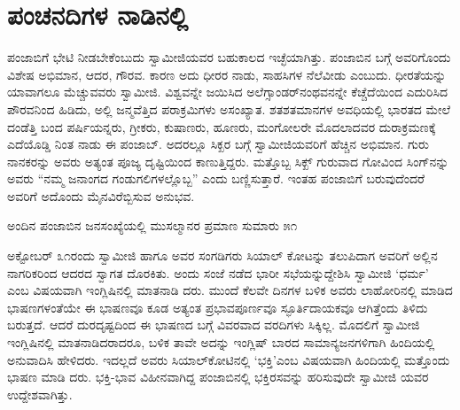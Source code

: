 
\chapter{ಪಂಚನದಿಗಳ ನಾಡಿನಲ್ಲಿ}

ಪಂಜಾಬಿಗೆ ಭೇಟಿ ನೀಡಬೇಕೆಂಬುದು ಸ್ವಾಮೀಜಿಯವರ ಬಹುಕಾಲದ ಇಚ್ಛೆಯಾಗಿತ್ತು. ಪಂಜಾಬಿನ ಬಗ್ಗೆ ಅವರಿಗೊಂದು ವಿಶೇಷ ಅಭಿಮಾನ, ಆದರ, ಗೌರವ. ಕಾರಣ ಅದು ಧೀರರ ನಾಡು, ಸಾಹಸಿಗಳ ನೆಲೆವೀಡು ಎಂಬುದು. ಧೀರತೆಯನ್ನು ಯಾವಾಗಲೂ ಮೆಚ್ಚುವವರು ಸ್ವಾಮೀಜಿ. ವಿಶ್ವವನ್ನೇ ಜಯಿಸಿದ ಅಲೆಗ್ಸಾಂಡರ್​ನಂಥವನನ್ನೇ ಕೆಚ್ಚೆದೆಯಿಂದ ಎದುರಿಸಿದ ಪೌರವನಿಂದ ಹಿಡಿದು, ಅಲ್ಲಿ ಜನ್ಮವೆತ್ತಿದ ಪರಾಕ್ರಮಿಗಳು ಅಸಂಖ್ಯಾತ. ಶತಶತಮಾನಗಳ ಅವಧಿಯಲ್ಲಿ ಭಾರತದ ಮೇಲೆ ದಂಡೆತ್ತಿ ಬಂದ ಪರ್ಷಿಯನ್ನರು, ಗ್ರೀಕರು, ಕುಷಾಣರು, ಹೂಣರು, ಮಂಗೋಲರೇ ಮೊದಲಾದವರ ದುರಾಕ್ರಮಣಕ್ಕೆ ಎದೆಯೊಡ್ಡಿ ನಿಂತ ನಾಡು ಈ ಪಂಜಾಬ್. ಅದರಲ್ಲೂ ಸಿಕ್ಖರ ಬಗ್ಗೆ ಸ್ವಾಮೀಜಿಯವರಿಗೆ ಹೆಚ್ಚಿನ ಅಭಿಮಾನ. ಗುರು ನಾನಕರನ್ನು ಅವರು ಅತ್ಯಂತ ಪೂಜ್ಯ ದೃಷ್ಟಿಯಿಂದ ಕಾಣುತ್ತಿದ್ದರು. ಮತ್ತೊಬ್ಬ ಸಿಕ್ಖ್ ಗುರುವಾದ ಗೋವಿಂದ ಸಿಂಗ್​ನನ್ನು ಅವರು “ನಮ್ಮ ಜನಾಂಗದ ಗಂಡುಗಲಿಗಳಲ್ಲೊಬ್ಬ” ಎಂದು ಬಣ್ಣಿಸುತ್ತಾರೆ. ಇಂತಹ ಪಂಜಾಬಿಗೆ ಬರುವುದೆಂದರೆ ಅವರಿಗೆ ಅದೊಂದು ಮೈನವಿರೆಬ್ಬಿಸುವ ಅನುಭವ.

ಅಂದಿನ ಪಂಜಾಬಿನ ಜನಸಂಖ್ಯೆಯಲ್ಲಿ ಮುಸಲ್ಮಾನರ ಪ್ರಮಾಣ ಸುಮಾರು ೫೧%

ಅಕ್ಟೋಬರ್ ೩೧ರಂದು ಸ್ವಾಮೀಜಿ ಹಾಗೂ ಅವರ ಸಂಗಡಿಗರು ಸಿಯಾಲ್ ಕೋಟನ್ನು ತಲುಪಿದಾಗ ಅವರಿಗೆ ಅಲ್ಲಿನ ನಾಗರಿಕರಿಂದ ಆದರದ ಸ್ವಾಗತ ದೊರಕಿತು. ಅಂದು ಸಂಜೆ ನಡೆದ ಭಾರೀ ಸಭೆಯನ್ನುದ್ದೇಶಿಸಿ ಸ್ವಾಮೀಜಿ ‘ಧರ್ಮ’ ಎಂಬ ವಿಷಯವಾಗಿ ಇಂಗ್ಲಿಷಿನಲ್ಲಿ ಮಾತನಾಡಿ ದರು. ಮುಂದೆ ಕೆಲವೇ ದಿನಗಳ ಬಳಿಕ ಅವರು ಲಾಹೋರಿನಲ್ಲಿ ಮಾಡಿದ ಭಾಷಣಗಳಂತೆಯೇ ಈ ಭಾಷಣವೂ ಕೂಡ ಅತ್ಯಂತ ಪ್ರಭಾವಪೂರ್ಣವೂ ಸ್ಫೂರ್ತಿದಾಯಕವೂ ಆಗಿತ್ತೆಂದು ತಿಳಿದು ಬರುತ್ತದೆ. ಆದರೆ ದುರದೃಷ್ಟದಿಂದ ಈ ಭಾಷಣದ ಬಗ್ಗೆ ವಿವರವಾದ ವರದಿಗಳು ಸಿಕ್ಕಿಲ್ಲ. ಮೊದಲಿಗೆ ಸ್ವಾಮೀಜಿ ಇಂಗ್ಲಿಷಿನಲ್ಲಿ ಮಾತನಾಡಿದರಾದರೂ, ಬಳಿಕ ತಾವೇ ಅದನ್ನು ಇಂಗ್ಲಿಷ್ ಬಾರದ ಸಾಮಾನ್ಯಜನಗಳಿಗಾಗಿ ಹಿಂದಿಯಲ್ಲಿ ಅನುವಾದಿಸಿ ಹೇಳಿದರು. ಇದಲ್ಲದೆ ಅವರು ಸಿಯಾಲ್​ಕೋಟಿನಲ್ಲಿ ‘ಭಕ್ತಿ’ಎಂಬ ವಿಷಯವಾಗಿ ಹಿಂದಿಯಲ್ಲಿ ಮತ್ತೊಂದು ಭಾಷಣ ಮಾಡಿ ದರು. ಭಕ್ತಿ-ಭಾವ ವಿಹೀನವಾಗಿದ್ದ ಪಂಜಾಬಿನಲ್ಲಿ ಭಕ್ತಿರಸವನ್ನು ಹರಿಸುವುದೇ ಸ್ವಾಮೀಜಿ ಯವರ ಉದ್ದೇಶವಾಗಿತ್ತು.

